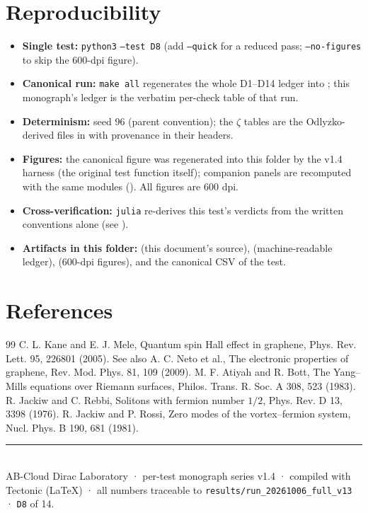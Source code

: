 \documentclass[11pt,a4paper]{article}
\begin{document}
\section{Reproducibility}
\begin{itemize}[leftmargin=1.2em, itemsep=0.15em]
\item \textbf{Single test:} \texttt{python3}  \texttt{--test D8} (add \texttt{--quick} for a reduced pass; \texttt{--no-figures} to skip the 600-dpi figure).
\item \textbf{Canonical run:} \texttt{make all} regenerates the whole D1--D14 ledger into ; this monograph's ledger is the verbatim per-check table of that run.
\item \textbf{Determinism:} seed 96 (parent convention); the $\zeta$ tables are the Odlyzko-derived files in  with provenance in their headers.
\item \textbf{Figures:} the canonical figure was regenerated into this folder by the v1.4 harness (the original test function itself); companion panels are recomputed with the same modules (). All figures are 600 dpi.
\item \textbf{Cross-verification:} \texttt{julia}  re-derives this test's verdicts from the written conventions alone (see ).
\item \textbf{Artifacts in this folder:}  (this document's source),  (machine-readable ledger),  (600-dpi figures), and the canonical CSV of the test.
\end{itemize}

\section*{References}
\begin{thebibliography}{99}\small
{} C. L. Kane and E. J. Mele, Quantum spin Hall effect in graphene, Phys. Rev. Lett. 95, 226801 (2005). See also A. C. Neto et al., The electronic properties of graphene, Rev. Mod. Phys. 81, 109 (2009).
 M. F. Atiyah and R. Bott, The Yang--Mills equations over Riemann surfaces, Philos. Trans. R. Soc. A 308, 523 (1983).
 R. Jackiw and C. Rebbi, Solitons with fermion number $1/2$, Phys. Rev. D 13, 3398 (1976).
 R. Jackiw and P. Rossi, Zero modes of the vortex--fermion system, Nucl. Phys. B 190, 681 (1981).
\end{thebibliography}

\vfill
\noindent\rule{\textwidth}{0.4pt}\\[0.2em]
{\footnotesize\color{labgray} AB-Cloud Dirac Laboratory · per-test monograph series v1.4 · compiled with Tectonic (LaTeX) · all numbers traceable to \texttt{results/run\_20261006\_full\_v13} · \texttt{D8} of 14.}
\end{document}
